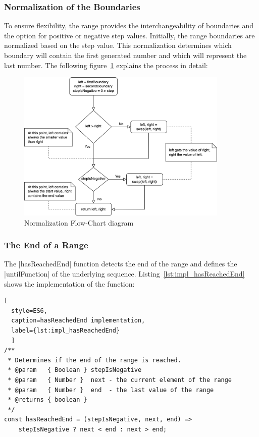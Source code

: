 \subsubsection{Normalization of the Boundaries}
\label{subsub:Normalization of the Boundaries}
To ensure flexibility, the range provides the interchangeability of boundaries
and the option for positive or negative step values. Initially, the range
boundaries are normalized based on the step value. This normalization
determines which boundary will contain the first generated number and which
will represent the last number.
The following figure~\ref{fig:norm-flowchart} explains the process in detail:

\begin{figure}[H]
    \centering
    \includegraphics[width=0.9\textwidth]{mainmatter/pictures/boundary-normalization.png}
    \caption{Normalization Flow-Chart diagram}
    \label{fig:norm-flowchart}
\end{figure}

\subsubsection{The End of a Range}
\label{subsub:The End of a Range}
The |hasReachedEnd| function detects the end of the range and defines the
|untilFunction| of the underlying sequence. Listing~\ref{lst:impl_hasReachedEnd}
shows the implementation of the function:

\begin{lstlisting}[
  style=ES6, 
  caption=hasReachedEnd implementation,
  label={lst:impl_hasReachedEnd}
  ]
/**
 * Determines if the end of the range is reached.
 * @param   { Boolean } stepIsNegative
 * @param   { Number }  next - the current element of the range
 * @param   { Number }  end  - the last value of the range
 * @returns { boolean }
 */
const hasReachedEnd = (stepIsNegative, next, end) =>
    stepIsNegative ? next < end : next > end;
\end{lstlisting}

